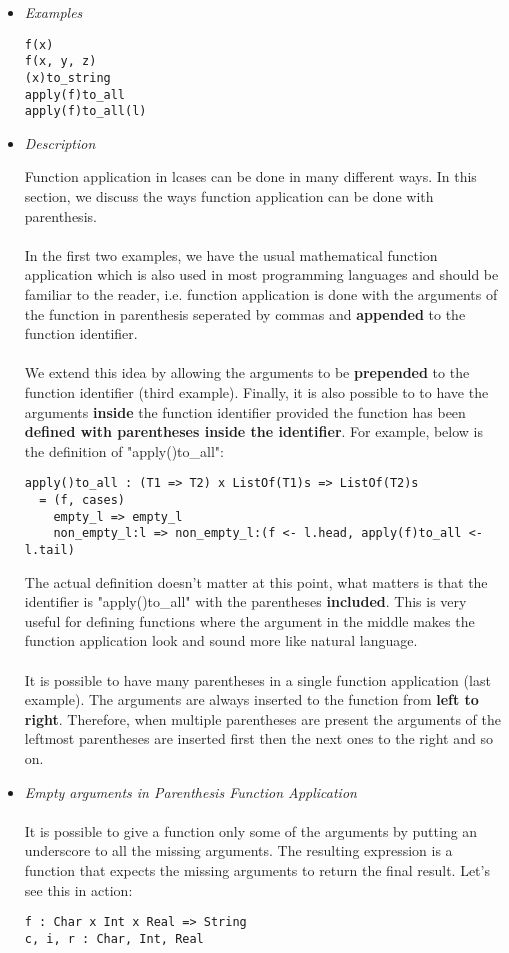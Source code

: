 \documentclass{article}
\begin{document}
\begin{itemize}
\item \textit{Examples}

\begin{verbatim}
f(x)
f(x, y, z)
(x)to_string
apply(f)to_all
apply(f)to_all(l)
\end{verbatim}

\item \textit{Description}

Function application in lcases can be done in many different ways. In this
section, we discuss the ways function application can be done with parenthesis.
\\\\
In the first two examples, we have the usual mathematical
function application which is also used in most programming languages and
should be familiar to the reader, i.e. function application is done with the 
arguments of the function in parenthesis seperated by commas and \textbf{appended}
to the function identifier.
\\\\
We extend this idea by allowing the arguments to be \textbf{prepended} to the
function identifier (third example). Finally, it is also possible to to have
the arguments \textbf{inside} the function identifier provided the function has
been \textbf{defined with parentheses inside the identifier}. For example,
below is the definition of "apply()to\_all":

\begin{verbatim}
apply()to_all : (T1 => T2) x ListOf(T1)s => ListOf(T2)s
  = (f, cases)
    empty_l => empty_l
    non_empty_l:l => non_empty_l:(f <- l.head, apply(f)to_all <- l.tail)
\end{verbatim}
The actual definition doesn't matter at this point, what matters is that the 
identifier is "apply()to\_all" with the parentheses \textbf{included}. This is very
useful for defining functions where the argument in the middle makes the function
application look and sound more like natural language.
\\\\
It is possible to have many parentheses in a single function application (last
example). The arguments are always inserted to the function from \textbf{left
to right}.  Therefore, when multiple parentheses are present the arguments of
the leftmost parentheses are inserted first then the next ones to the right and
so on.

\item \textit{Empty arguments in Parenthesis Function Application}
\\\\
It is possible to give a function only some of the arguments by putting an
underscore to all the missing arguments. The resulting expression is a function
that expects the missing arguments to return the final result. Let's see
this in action:
\begin{verbatim}
f : Char x Int x Real => String
c, i, r : Char, Int, Real


\end{verbatim}
\end{itemize}
\end{document}
